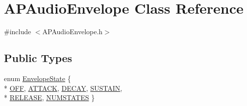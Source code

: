 \hypertarget{class_a_p_audio_envelope}{\section{A\+P\+Audio\+Envelope Class Reference}
\label{class_a_p_audio_envelope}
}


{\ttfamily \#include $<$A\+P\+Audio\+Envelope.\+h$>$}

\subsection*{Public Types}
\begin{DoxyCompactItemize}
\item 
enum \hyperlink{class_a_p_audio_envelope_aed3a129a289360005327919f10ce02b9}{Envelope\+State} \{ \\*
\hyperlink{class_a_p_audio_envelope_aed3a129a289360005327919f10ce02b9a1d3e450a9f1f26eeffb3515b8b8bbeaf}{O\+F\+F}, 
\hyperlink{class_a_p_audio_envelope_aed3a129a289360005327919f10ce02b9a86b388b5455684cec6b24f2c27032071}{A\+T\+T\+A\+C\+K}, 
\hyperlink{class_a_p_audio_envelope_aed3a129a289360005327919f10ce02b9ac27b787b02a255670fe4a44efe61e912}{D\+E\+C\+A\+Y}, 
\hyperlink{class_a_p_audio_envelope_aed3a129a289360005327919f10ce02b9a64a32d0bacf8822b287b24f77ec2b68d}{S\+U\+S\+T\+A\+I\+N}, 
\\*
\hyperlink{class_a_p_audio_envelope_aed3a129a289360005327919f10ce02b9aa669da511b590c1315163fe4166f675b}{R\+E\+L\+E\+A\+S\+E}, 
\hyperlink{class_a_p_audio_envelope_aed3a129a289360005327919f10ce02b9a0607abcd44cb1aaad09f8a5f6503e403}{N\+U\+M\+S\+T\+A\+T\+E\+S}
 \}
\end{DoxyCompactItemize}
